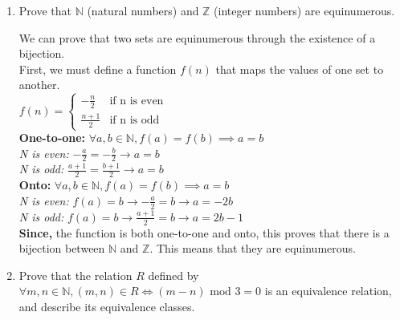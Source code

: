 \documentclass[12pt]{article}
\begin{document}
\begin{enumerate}


\item Prove that $\mathbb{N}$ (natural numbers) and $\mathbb{Z}$ (integer numbers) are equinumerous.

We can prove that two sets are equinumerous through the existence of a bijection.\\
First, we must define a function $f(n)$ that maps the values of one set to another.\\
$f(n) = \begin{cases}
    - \frac{n}{2} & \mbox{if n is even}\\
    \frac{n + 1}{2} & \mbox{if n is odd}
\end{cases}$\\
\textbf{One-to-one:} $\forall a, b \in \mathbb{N}, f(a) = f(b) \implies a = b$\\
\textit{N is even:} $-\frac{a}{2} = -\frac{b}{2} \rightarrow a = b$\\
\textit{N is odd:} $\frac{a + 1}{2} = \frac{b + 1}{2} \rightarrow a = b$\\
\textbf{Onto:} $\forall a, b \in \mathbb{N}, f(a) = f(b) \implies a = b$\\
\textit{N is even:} $f(a) = b \rightarrow -\frac{a}{2} = b \rightarrow a = -2b$\\
\textit{N is odd:} $f(a) = b \rightarrow \frac{a + 1}{2} = b \rightarrow a = 2b - 1$\\
\textbf{Since,} the function is both one-to-one and onto, this proves that there is a bijection between $\mathbb{N}$ and $\mathbb{Z}$. This means that they are equinumerous.



\item Prove that the relation $R$ defined by $\forall m, n \in \mathbb{N}, (m, n) \in R \Leftrightarrow (m - n) \text{ mod } 3 = 0$ is an equivalence relation, and describe its equivalence classes.


\end{enumerate}
\end{document}
